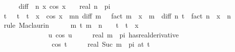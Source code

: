 \begin{isabellebody}
%
\isadelimproof
%
\endisadelimproof
%
\isatagproof
{}\isamarkupfalse%
\ {\isacharminus}{\kern0pt}\isanewline
\ \ \isamarkupfalse%
\ {\isacharquery}{\kern0pt}diff\ {\isacharequal}{\kern0pt}\ {\isachardoublequoteopen}{\isasymlambda}n\ x{\isachardot}{\kern0pt}\ cos\ {\isacharparenleft}{\kern0pt}x\ {\isacharplus}{\kern0pt}\ {}{\isacharslash}{\kern0pt}{}\ {\isacharasterisk}{\kern0pt}\ real\ n\ {\isacharasterisk}{\kern0pt}\ pi{\isacharparenright}{\kern0pt}{\isachardoublequoteclose}\isanewline
\ \ \isamarkupfalse%
\ {\isachardoublequoteopen}{\isasymexists}t{\isachardot}{\kern0pt}\ {}\ {\isacharless}{\kern0pt}\ t\ {\isasymand}\ t\ {\isacharless}{\kern0pt}\ x\ {\isasymand}\ cos\ x\ {\isacharequal}{\kern0pt}\ {\isacharparenleft}{\kern0pt}{\isasymSum}m{\isacharless}{\kern0pt}n{\isachardot}{\kern0pt}\ {\isacharquery}{\kern0pt}diff\ m\ {}\ {\isacharslash}{\kern0pt}\ {\isacharparenleft}{\kern0pt}fact\ m{\isacharparenright}{\kern0pt}\ {\isacharasterisk}{\kern0pt}\ x\ {\isacharcircum}{\kern0pt}\ m{\isacharparenright}{\kern0pt}\ {\isacharplus}{\kern0pt}\ {\isacharquery}{\kern0pt}diff\ n\ t\ {\isacharslash}{\kern0pt}\ fact\ n\ {\isacharasterisk}{\kern0pt}\ x\ {\isacharcircum}{\kern0pt}\ n{\isachardoublequoteclose}\isanewline
\ \ \isamarkupfalse%
\ {\isacharparenleft}{\kern0pt}rule\ Maclaurin{\isacharparenright}{\kern0pt}\isanewline
\ \ \ \ \isamarkupfalse%
\ {\isachardoublequoteopen}{\isasymforall}m\ t{\isachardot}{\kern0pt}\ m\ {\isacharless}{\kern0pt}\ n\ {\isasymand}\ {}\ {\isasymle}\ t\ {\isasymand}\ t\ {\isasymle}\ x\ {\isasymlongrightarrow}\isanewline
\ \ \ \ \ \ \ \ \ \ \ \ \ \ {\isacharparenleft}{\kern0pt}{\isacharparenleft}{\kern0pt}{\isasymlambda}u{\isachardot}{\kern0pt}\ cos\ {\isacharparenleft}{\kern0pt}u\ {\isacharplus}{\kern0pt}\ {}\ {\isacharslash}{\kern0pt}\ {}\ {\isacharasterisk}{\kern0pt}\ real\ m\ {\isacharasterisk}{\kern0pt}\ pi{\isacharparenright}{\kern0pt}{\isacharparenright}{\kern0pt}\ has{\isacharunderscore}{\kern0pt}real{\isacharunderscore}{\kern0pt}derivative\ \isanewline
\ \ \ \ \ \ \ \ \ \ \ \ \ \ \ cos\ {\isacharparenleft}{\kern0pt}t\ {\isacharplus}{\kern0pt}\ {}\ {\isacharslash}{\kern0pt}\ {}\ {\isacharasterisk}{\kern0pt}\ real\ {\isacharparenleft}{\kern0pt}Suc\ m{\isacharparenright}{\kern0pt}\ {\isacharasterisk}{\kern0pt}\ pi{\isacharparenright}{\kern0pt}{\isacharparenright}{\kern0pt}\ {\isacharparenleft}{\kern0pt}at\ t{\isacharparenright}{\kern0pt}{\isachardoublequoteclose}\isanewline

\end{isabellebody}
